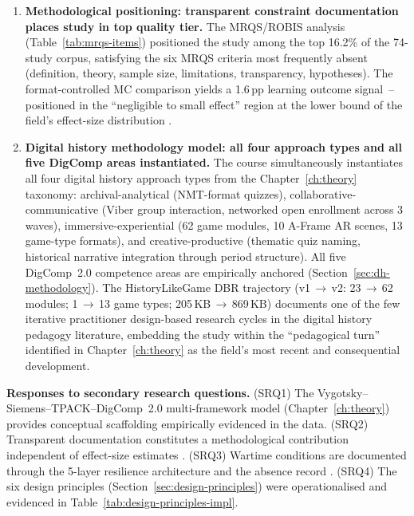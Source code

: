 \begin{enumerate}
\item \textbf{Methodological positioning: transparent constraint documentation places study in top quality tier.}
The MRQS/ROBIS analysis (Table~\ref{tab:mrqs-items}) positioned the study among the top 16.2\% of the 74-study corpus, satisfying the six MRQS criteria most frequently absent (definition, theory, sample size, limitations, transparency, hypotheses). The format-controlled MC comparison yields a 1.6\,pp learning outcome signal~-- positioned in the ``negligible to small effect'' region at the lower bound of the field's effect-size distribution \cite{KorniienkoSemerikov2024, Korniienko2025mrqs}.

\item \textbf{Digital history methodology model: all four approach types and all five DigComp areas instantiated.}
The course simultaneously instantiates all four digital history approach types
from the Chapter~\ref{ch:theory} taxonomy: archival-analytical (NMT-format
quizzes), collaborative-communicative (Viber group interaction, networked open
enrollment across 3 waves), immersive-experiential (62 game modules, 10 A-Frame
AR scenes, 13 game-type formats), and creative-productive (thematic quiz naming,
historical narrative integration through period structure).
All five DigComp~2.0 competence areas \cite{Vuorikari2016} are empirically
anchored (Section~\ref{sec:dh-methodology}).
The HistoryLikeGame DBR trajectory (v1$\,\to\,$v2: 23$\,\to\,$62 modules;
1$\,\to\,$13 game types; 205\,KB$\,\to\,$869\,KB) documents one of the few iterative
practitioner design-based research cycles \cite{Reeves2003} in the digital history
pedagogy literature, embedding the study within the ``pedagogical turn'' identified
in Chapter~\ref{ch:theory} as the field's most recent and consequential development.

\end{enumerate}

\textbf{Responses to secondary research questions.}
(SRQ1) The Vygotsky--Siemens--TPACK--DigComp~2.0 multi-framework model (Chapter~\ref{ch:theory}) provides conceptual scaffolding empirically evidenced in the data.
(SRQ2) Transparent documentation constitutes a methodological contribution independent of effect-size estimates \cite{Korniienko2025mrqs}.
(SRQ3) Wartime conditions are documented through the 5-layer resilience architecture and the absence record \cite{UNESCO2023, Martynets202428}.
(SRQ4) The six design principles (Section~\ref{sec:design-principles}) were operationalised and evidenced in Table~\ref{tab:design-principles-impl}.

